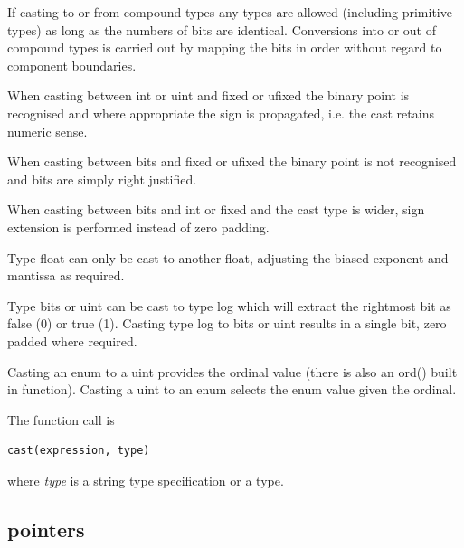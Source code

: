                 If casting to or from compound types any types are allowed
                (including primitive types) as long as the numbers of bits are
                identical. Conversions into or out of compound types is carried
                out by mapping the bits in order without regard to component
                boundaries.

                When casting between int or uint and fixed or ufixed the binary
                point is recognised and where appropriate the sign is
                propagated, i.e. the cast retains numeric sense.

                When casting between bits and fixed or ufixed the binary point
                is not recognised and bits are simply right justified.

                When casting between bits and int or fixed and the cast type is
                wider, sign extension is performed instead of zero padding.

                Type float can only be cast to another float, adjusting the
                biased exponent and mantissa as required.

                Type bits or uint can be cast to type log which will extract the
                rightmost bit as false (0) or true (1). Casting type log to bits
                or uint results in a single bit, zero padded where required.

                Casting an enum to a uint provides the ordinal value (there is
                also an ord() built in function). Casting a uint to an enum
                selects the enum value given the ordinal.

                The function call is
                \begin{lstlisting}[gobble=16, language=threepl]
                   cast(expression, type)
                \end{lstlisting}
                where {\em type} is a string type specification or a type.


        \subsection{pointers}\label{sec:pointers}


